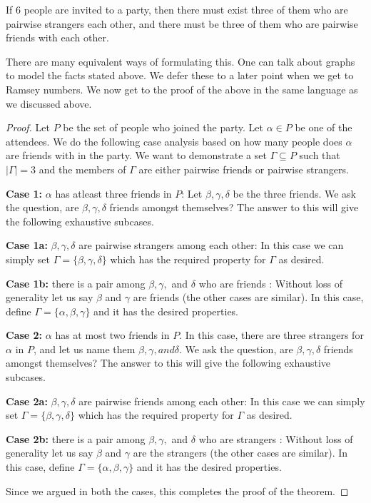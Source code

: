 \begin{theorem}
If $6$ people are invited to a party, then there must exist three of them who are pairwise strangers each other, and there must be three of them who are pairwise  friends with each other. 
\end{theorem}
There are many equivalent ways of formulating this. One can talk about graphs to model the facts stated above. We defer these to a later point when we get to Ramsey numbers. We now get to the proof of the above in the same language as we discussed above.
\begin{proof}
Let $P$ be the set of people who joined the party. Let $\alpha \in P$ be one of the attendees. We do the following case analysis based on how many people does $\alpha$ are friends with in the party. We want to demonstrate a set $\Gamma \subseteq P$ such that $|\Gamma| = 3$ and the members of $\Gamma$ are either pairwise friends or pairwise strangers.
\begin{description}
\item{{\bf Case 1:} $\alpha$ has atleast three friends in $P$:} Let $\beta, \gamma, \delta$ be the three friends. We ask the question, are $\beta, \gamma, \delta$ friends amongst themselves? The answer to this will give the following exhaustive subcases.
\begin{description}
\item{{\bf Case 1a:} $\beta, \gamma, \delta$ are pairwise strangers among each other:} In this case  we can simply set $\Gamma = \{ \beta, \gamma, \delta \}$ which has the required property for $\Gamma$ as desired.
\item{{\bf Case 1b:} there is a pair among $\beta, \gamma,$ and $\delta$ who are friends :} Without loss of generality let us say $\beta$ and $\gamma$ are friends (the other cases are similar). In this case, define $\Gamma = \{\alpha, \beta,\gamma\}$ and it has the desired properties.
\end{description}
\item{{\bf Case 2:} $\alpha$ has at most two friends in $P$}. In this case, there are three strangers for $\alpha$ in $P$, and let us name them $\beta, \gamma, and \delta$. We ask the question, are $\beta, \gamma, \delta$ friends amongst themselves? The answer to this will give the following exhaustive subcases.
\begin{description}
\item{{\bf Case 2a:} $\beta, \gamma, \delta$ are pairwise friends among each other:} In this case  we can simply set $\Gamma = \{ \beta, \gamma, \delta \}$ which has the required property for $\Gamma$ as desired.
\item{{\bf Case 2b:} there is a pair among $\beta, \gamma,$ and $\delta$ who are strangers :} Without loss of generality let us say $\beta$ and $\gamma$ are the strangers (the other cases are similar). In this case, define $\Gamma = \{\alpha, \beta,\gamma\}$ and it has the desired properties.
\end{description}
\end{description}
Since we argued in both the cases, this completes the proof of the theorem.
\end{proof}
